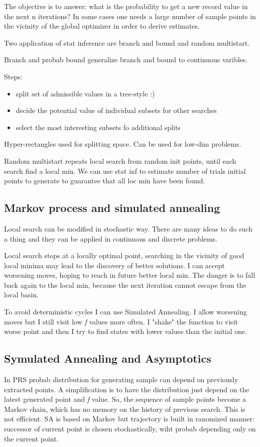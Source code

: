 \documentclass[10pt]{article}
\begin{document}
The objective is to answer: what is the probability to get a new record value in the next n
iterations?  In some cases one needs a large number of sample points in the vicinity of the global optimizer in order to derive estimates.

Two application of stat inference are branch and bound and random multistart.

Branch and probab bound generalize branch and bound to continuous varibles.

Steps: 
\begin{itemize}
\item split set of admissible values in a tree-style :)
\item decide the potential value of individual subsets for other searches
\item select the most interesting subsets fo additional splits
\end{itemize}
	
Hyper-rectangles used for splitting space. Can be used for low-dim problems.

Random multistart repeats local search from random init points, until each search find a local min. We can use stat inf to estimate number of trials initial points to generate to guarantee that all loc min have been found. 

\subsection{Markov process and simulated annealing}

Local search can be modified in stochastic way. There are many ideas to do such a thing and they can be applied in continuous and discrete problems. 

Local search stops at a locally optimal point, searching in the vicinity of good local minima may lead to the
discovery of better solutions. I can accept worsening moves, hoping to reach in future better local min. The danger is to fall back again to the local min, because the next iteration cannot escape from the local basin. 

To avoid deterministic cycles I can use Simulated Annealing. I allow worsening moves but I still visit low \textit{f} values more often. I "shake" the function to visit worse point and then I try to find states with lower values than the initial one.

\subsection{Symulated Annealing and Asymptotics}
In PRS probab distribution for generating sample can depend on previously extracted points. A simplification is  to have the distribution just depend on the latest generated point and \textit{f} value. So, the sequence of sample points become a Markov chain, which has no memory on the history of previous search. This is not efficient.
SA is based on Markov but trajectory is built in ranomized manner: successor of current point is chosen stochastically, wiht probab depending only on the current point.
\end{document}
